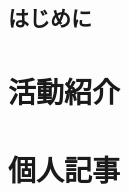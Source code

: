 \documentclass[a5paper,openary]{jsbook}%
\begin{document}


\frontmatter


\chapter*{はじめに}


\renewcommand{\contentsname}{\makebox[\linewidth]{\hfill 目\hspace{0.8cm}次 \hfill}}

\setcounter{tocdepth}{0}
\tableofcontents



\mainmatter
\let\originalchapter=\chapter
\def\chapter{\let\cleardoublepage\clearpage\originalchapter}


\pagestyle{fancy}
\fancyhf{}
\renewcommand{\sectionmark}[1]{\markboth{\thesection #1}{}}
\renewcommand{\subsectionmark}[1]{\markright{\thesubsection #1}}
\fancyhead{\gdef\headrulewidth{.0pt}}
\fancyhead[ER]{\leftmark}
\fancyhead[EL]{\thepage}
\fancyhead[OL]{\rightmark}
\fancyhead[OR]{\thepage}
\cfoot{}

\part{活動紹介}\label{Part:Katsudo}



\afterpage{\blankpage}

\part{個人記事}\label{Part:KOJIN}



\backmatter


\end{document}
